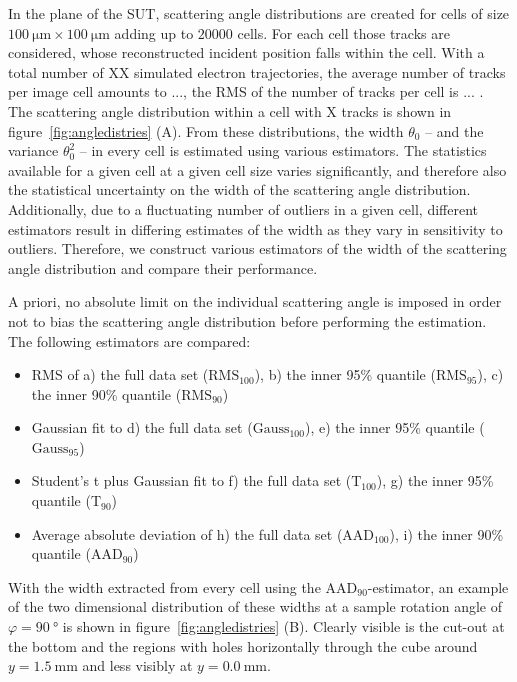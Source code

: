 \documentclass{PoS}
\newcommand{\rmshundred}{\ensuremath{\textrm{RMS}_\textrm{100}}}
\newcommand{\rmsninetyfive}{\ensuremath{\textrm{RMS}_\textrm{95}}}
\newcommand{\rmsninety}{\ensuremath{\textrm{RMS}_\textrm{90}}}
\newcommand{\gausshundred}{\ensuremath{\textrm{Gauss}_\textrm{100}}}
\newcommand{\gaussninety}{\ensuremath{\textrm{Gauss}_\textrm{95}}}
\newcommand{\studhundred}{\ensuremath{\textrm{T}_\textrm{100}}}
\newcommand{\studninety}{\ensuremath{\textrm{T}_\textrm{90}}}
\newcommand{\aadhundred}{\ensuremath{\textrm{AAD}_\textrm{100}}}
\newcommand{\aadninety}{\ensuremath{\textrm{AAD}_\textrm{90}}}
\begin{document}
In the plane of the SUT, scattering angle distributions are created for cells of size $\SI{100}{\um} \times \SI{100}{\um}$ adding up to $\num{20000}$ cells. %
For each cell those tracks are considered, whose reconstructed incident position falls within the cell. 
With a total number of XX simulated electron trajectories, the average number of tracks per image cell amounts to ..., the RMS of the number of tracks per cell is ... . %
The scattering angle distribution within a cell with X tracks is shown in figure~\ref{fig:angledistries} (A). %
From these distributions, the width $\theta_0$ -- and the variance $\theta_0^2$ -- in every cell is estimated using various estimators. 
The statistics available for a given cell at a given cell size varies significantly, and therefore also the statistical uncertainty on the width of the scattering angle distribution. 
Additionally, due to a fluctuating number of outliers in a given cell, different estimators result in differing estimates of the width as they vary in sensitivity to outliers. 
Therefore, we construct various estimators of the width of the scattering angle distribution and compare their performance. 

A priori, no absolute limit on the individual scattering angle is imposed in order not to bias the scattering angle distribution before performing the estimation. 
The following estimators are compared:
\begin{itemize}\itemsep0pt
 \item RMS of a) the full data set ($\rmshundred$), b) the inner 95\% quantile ($\rmsninetyfive$), c) the inner 90\% quantile ($\rmsninety$)
 \item Gaussian fit to d) the full data set ($\gausshundred$), e) the inner 95\% quantile ($\gaussninety$)
 \item Student's t plus Gaussian fit to f) the full data set ($\studhundred$), g) the inner 95\% quantile ($\studninety$) %
 \item Average absolute deviation of h) the full data set ($\aadhundred$), i) the inner 90\% quantile ($\aadninety$)
 
\end{itemize}

With the width extracted from every cell using the $\aadninety$-estimator,
 an example of the two dimensional distribution of these widths at a sample rotation angle of $\varphi = \SI{90}{\degree}$ is shown in figure~\ref{fig:angledistries} (B). 
Clearly visible is the cut-out at the bottom and the regions with holes horizontally through the cube around $y=\SI{1.5}{\mm}$ and less visibly at $y=\SI{0.0}{\mm}$.
\end{document}
